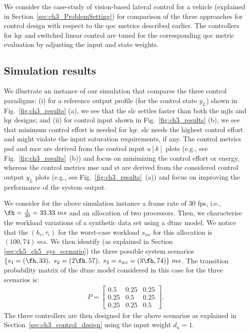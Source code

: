 We consider the case-study of vision-based lateral
control for a vehicle (explained in Section~\ref{sec:ch3_ProblemSetting}) for comparison of the three approaches
for control design with respect to the \gls{qoc} metrics described
earlier. The controllers for \gls{lqr} and switched linear control are tuned for the corresponding \gls{qoc} metric evaluation by adjusting the input and state weights. 

\subsection{Simulation results}
We illustrate an instance of our simulation that compares the three control paradigms: (i) for a reference output profile (for the control state $y_L$) shown in Fig.~\ref{fig:ch3_results} (a), we see that the \gls{slc} settles faster than both the \gls{mjls} and \gls{lqr} designs; and (ii) for control input shown in Fig.~\ref{fig:ch3_results} (b), we see that minimum control effort is needed for \gls{lqr}. \gls{slc} needs the highest control effort and might violate the input saturation requirements, if any. The control metrics \gls{psd} and \gls{mce} are derived from the control input $u[k]$ plots (e.g., see Fig.~\ref{fig:ch3_results}~(b)) and focus on minimizing the control effort or energy, whereas the control metrics \gls{mse} and \gls{st} are derived from the considered control output $y_L$ plots (e.g., see Fig.~\ref{fig:ch3_results}~(a)) and focus on improving the performance of the system output.  

We consider for the above simulation instance a frame rate of 30 fps, i.e., $\fh=\frac{1}{30}=33.33\ ms$ and an allocation of two processors. Then, we characterise the workload variations of a synthetic data set using a \gls{dtmc} model.
We notice that the $(h_i,\tau_i)$ for the worst-case workload $s_{wc}$ for this allocation is $(100,74)\ ms$. We then identify (as explained in Section \ref{sec:ch5_ch5_sys_scenario}) the three possible system scenarios $\{s_1=(\fh,33),\ s_2=(2\fh,57),\ s_3=s_{wc}=(3\fh,74)\}\ ms$. The transition probability matrix of the \gls{dtmc} model considered in this case for the three scenarios is: 
\begin{align}
P = 
\begin{bmatrix}
0.5 & 0.25 & 0.25 \\
0.25 & 0.5 & 0.25 \\
0.25 & 0.25 & 0.5 \nonumber
\end{bmatrix}.
\end{align}
The three controllers are then designed for the above scenarios as explained in Section~\ref{sec:ch3_control_design} using the input weight $d_u=1$. 

